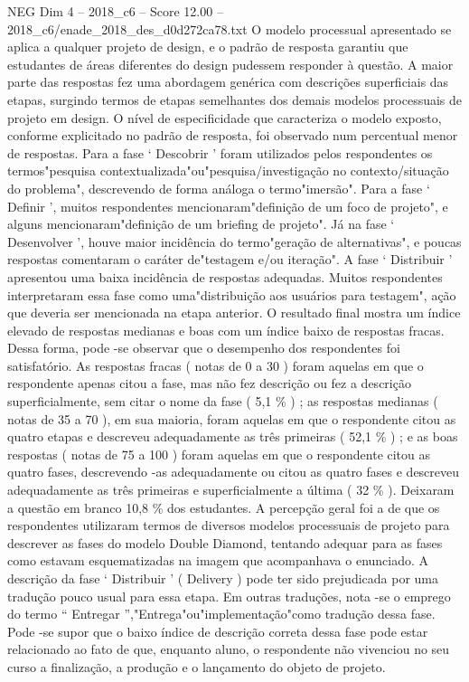 \begin{textsample}{NEG Dim 4 – 2018\_c6 – Score 12.00 – 2018\_c6/enade\_2018\_des\_d0d272ca78.txt}
O modelo processual apresentado se aplica a qualquer projeto de design, e o padrão de resposta garantiu que estudantes de áreas diferentes do design pudessem responder à questão.
A maior parte das respostas fez uma abordagem genérica com descrições superficiais das etapas, surgindo termos de etapas semelhantes dos demais modelos processuais de projeto em design.
O nível de especificidade que caracteriza o modelo exposto, conforme explicitado no padrão de resposta, foi observado num percentual menor de respostas.
Para a fase ‘ Descobrir ’ foram utilizados pelos respondentes os termos"pesquisa contextualizada"ou"pesquisa/investigação no contexto/situação do problema", descrevendo de forma análoga o termo"imersão".
Para a fase ‘ Definir ’, muitos respondentes mencionaram"definição de um foco de projeto", e alguns mencionaram"definição de um briefing de projeto".
Já na fase ‘ Desenvolver ’, houve maior incidência do termo"geração de alternativas", e poucas respostas comentaram o caráter de"testagem e/ou iteração".
A fase ‘ Distribuir ’ apresentou uma baixa incidência de respostas adequadas.
Muitos respondentes interpretaram essa fase como uma"distribuição aos usuários para testagem", ação que deveria ser mencionada na etapa anterior.
O resultado final mostra um índice elevado de respostas medianas e boas com um índice baixo de respostas fracas.
Dessa forma, pode -se observar que o desempenho dos respondentes foi satisfatório.
As respostas fracas ( notas de 0 a 30 ) foram aquelas em que o respondente apenas citou a fase, mas não fez descrição ou fez a descrição superficialmente, sem citar o nome da fase ( 5,1 \% ) ; as respostas medianas ( notas de 35 a 70 ), em sua maioria, foram aquelas em que o respondente citou as quatro etapas e descreveu adequadamente as três primeiras ( 52,1 \% ) ; e as boas respostas ( notas de 75 a 100 ) foram aquelas em que o respondente citou as quatro fases, descrevendo -as adequadamente ou citou as quatro fases e descreveu adequadamente as três primeiras e superficialmente a última ( 32 \% ).
Deixaram a questão em branco 10,8 \% dos estudantes.
A percepção geral foi a de que os respondentes utilizaram termos de diversos modelos processuais de projeto para descrever as fases do modelo Double Diamond, tentando adequar para as fases como estavam esquematizadas na imagem que acompanhava o enunciado.
A descrição da fase ‘ Distribuir ’ ( Delivery ) pode ter sido prejudicada por uma tradução pouco usual para essa etapa.
Em outras traduções, nota -se o emprego do termo “ Entregar ”,"Entrega"ou"implementação"como tradução dessa fase.
Pode -se supor que o baixo índice de descrição correta dessa fase pode estar relacionado ao fato de que, enquanto aluno, o respondente não vivenciou no seu curso a finalização, a produção e o lançamento do objeto de projeto.

\end{textsample}
